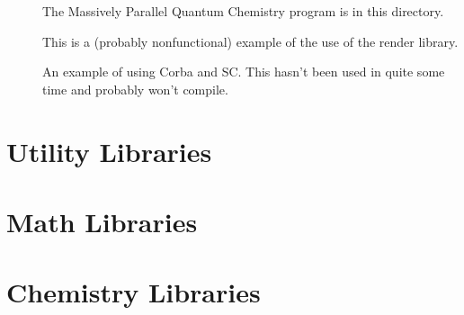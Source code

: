 \documentclass{report}
\begin{document}
\begin{description}
\item[]
  The Massively Parallel Quantum Chemistry program is in this directory.

\item[]
  This is a (probably nonfunctional) example of the use of the render
  library.

\item[]
  An example of using Corba and SC.  This hasn't been used in quite
  some time and probably won't compile.

\end{description}

\part{Utility Libraries}







\part{Math Libraries}





\part{Chemistry Libraries}



\printindex
\end{document}
